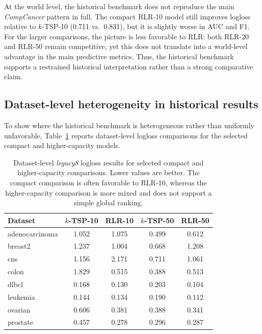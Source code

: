 \documentclass[11pt, a4paper]{article}
\newcommand{\stdtablefont}{\small}
\newcommand{\stdtablelayout}{%
  \stdtablefont
  \setlength{\tabcolsep}{4pt}
  \renewcommand{\arraystretch}{1.2}
}
\begin{document}
At the world level, the historical benchmark does not reproduce the main \emph{CompCancer} pattern in full. The compact RLR-10 model still improves logloss relative to $k$-TSP-10 (0.711 vs.\ 0.831), but it is slightly worse in AUC and F1. For the larger comparisons, the picture is less favorable to RLR: both RLR-20 and RLR-50 remain competitive, yet this does not translate into a world-level advantage in the main predictive metrics. Thus, the historical benchmark supports a restrained historical interpretation rather than a strong comparative claim.

\subsection{Dataset-level heterogeneity in historical results}

To show where the historical benchmark is heterogeneous rather than uniformly unfavorable, Table~\ref{tab:legacy_dataset_logloss} reports dataset-level logloss comparisons for the selected compact and higher-capacity models.

\begin{table}[!htbp]
\centering
\caption{Dataset-level \emph{legacy8} logloss results for selected compact and higher-capacity comparisons. Lower values are better. The compact comparison is often favorable to RLR-10, whereas the higher-capacity comparison is more mixed and does not support a simple global ranking.}
\label{tab:legacy_dataset_logloss}
{\stdtablelayout
\begin{tabular}{lcccc}
\toprule
\textbf{Dataset} & \textbf{$k$-TSP-10} & \textbf{RLR-10} & \textbf{$k$-TSP-50} & \textbf{RLR-50} \\
\midrule
adenocarcinoma & 1.052 & 1.075 & 0.499 & 0.612 \\
breast2        & 1.237 & 1.004 & 0.668 & 1.208 \\
cns            & 1.156 & 2.171 & 0.711 & 1.061 \\
colon          & 1.829 & 0.515 & 0.388 & 0.513 \\
dlbcl          & 0.168 & 0.130 & 0.203 & 0.104 \\
leukemia       & 0.144 & 0.134 & 0.190 & 0.112 \\
ovarian        & 0.606 & 0.381 & 0.388 & 0.341 \\
prostate       & 0.457 & 0.278 & 0.296 & 0.287 \\
\bottomrule
\end{tabular}
}
\end{table}
\end{document}
